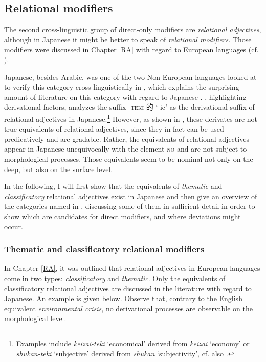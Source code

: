 \documentclass [output=book,colorlinks,citecolor=brown]{langscibook}
\begin{document}
\subsection{Relational modifiers}
\label{RAJapanese}

The second cross-linguistic group of direct-only modifiers are \textit{relational adjectives}, although in Japanese it might be better to speak of \textit{relational modifiers}. Those modifiers were discussed in Chapter \ref{RA} with regard to European languages (cf. \citealt{fabregas:2007:internal, rainer:2013:can, bortolotto:2016:RA}). %

Japanese, besides Arabic, was one of the two Non-European languages looked at to verify this category cross-linguistically in \citet{bisetto:2010:RA}, which explains the surprising amount of literature on this category with regard to Japanese \citep{nagano:2015:RA, nagano:2016:are, nagano:2018:conversion, shimada:2018:relational, morita:2010:internal, morita:2011:three, morita:2013:morph}. \citet{bisetto:2010:RA}, highlighting derivational factors, analyzes the suffix -\textsc{teki} 的 `-ic' as the derivational suffix of relational adjectives in Japanese.\footnote{Examples include \textit{keizai-teki} `economical' derived from \textit{keizai} `economy' or \textit{shukan-teki} `subjective' derived from \textit{shukan} `subjectivity’, cf. also \citet[71–73]{bisetto:2010:RA}.} However, as shown in \citet[48–50]{nagano:2016:are}, these derivates are not true equivalents of relational adjectives, since they in fact can be used predicatively and are gradable. Rather, the equivalents of relational adjectives appear in Japanese unequivocally with the element \textsc{no} and are not subject to morphological processes. Those equivalents seem to be nominal not only on the deep, but also on the surface level.

In the following, I will first show that the equivalents of \textit{thematic} and \textit{classificatory} relational adjectives exist in Japanese and then give an overview of the categories named in \citet{nagano:2016:are}, discussing some of them in sufficient detail in order to show which are candidates for direct modifiers, and where deviations might occur.

\subsubsection{Thematic and classificatory relational modifiers}

In Chapter \ref{RA}, it was outlined that relational adjectives in European languages come in two types: \textit{classificatory} and \textit{thematic}. Only the equivalents of classificatory relational adjectives are discussed in the literature with regard to Japanese. An example is given below. Observe that, contrary to the English equivalent \textit{environmental crisis}, no derivational processes are observable on the morphological level. %
\end{document}
